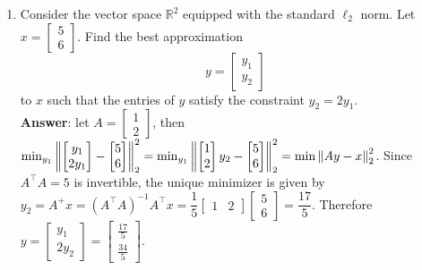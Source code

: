 \documentclass{article}
\begin{document}
\begin{enumerate}
    \item Consider the vector space $\mathbb{R}^2$ equipped with the standard $\ell_2$ norm. Let $x=\begin{bmatrix}
                  5 \\6
              \end{bmatrix}$. Find the best approximation \[y=\begin{bmatrix}
                  y_1 \\y_2
              \end{bmatrix}\] to $x$ such that the entries of $y$ satisfy the constraint $y_2=2y_1$.\\
          \textbf{Answer}: let $A=\begin{bmatrix}1\\2\end{bmatrix}$, then $\min_{y_1}\norm{\begin{bmatrix}y_1\\2y_1\end{bmatrix}-\begin{bmatrix}5\\6\end{bmatrix}}_2^2=\min_{y_1}\norm{\begin{bmatrix}1\\2\end{bmatrix}y_2-\begin{bmatrix}5\\6\end{bmatrix}}_2^2=\min\norm{Ay-x}_2^2$. Since $A^\top A=5$ is invertible, the unique minimizer is given by $y_2=A^+x=(A^\top A)^{-1}A^\top x=\dfrac{1}{5}\begin{bmatrix}1&2\end{bmatrix}\begin{bmatrix}5\\6\end{bmatrix}=\dfrac{17}{5}$. Therefore $y=\begin{bmatrix}
              y_1\\2y_2
          \end{bmatrix}=\begin{bmatrix}
              \frac{17}{5}\\\frac{34}{5}
          \end{bmatrix}$.
\end{enumerate}
\end{document}
